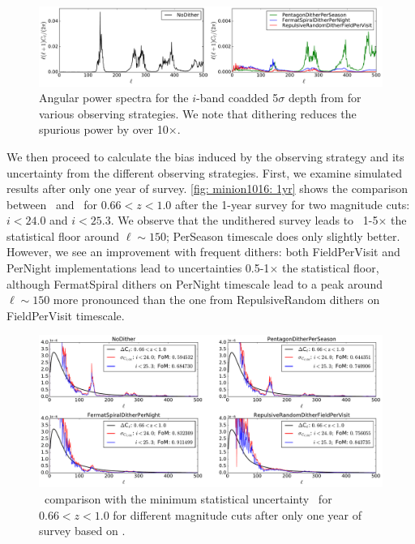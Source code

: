 \begin{figure}[!htb]
      \centering\includegraphics[width=\linewidth]{figs/awan_coaddpowerspectrum.pdf}
      \vspace*{-2em}
\caption{Angular power spectra for the  $i$-band coadded 5$\sigma$ depth from  for various observing strategies. We note that dithering reduces the spurious power by over 10$\times$.}
\label{fig: coaddPowerSpectrum}
\end{figure}

We then proceed to calculate the bias induced by the observing strategy and its uncertainty from the different observing strategies. First, we examine simulated results after only one year of survey. \autoref{fig: minion1016: 1yr} shows the comparison between \sigmaOS\ and \statFloor\ for $0.66<z<1.0$ after the 1-year survey for two magnitude cuts: $i<24.0$ and $i<25.3$. We observe that the undithered survey leads to \sigmaOS\ 1-5$\times$ the statistical floor around $\ell\sim150$; PerSeason timescale does only slightly better. However, we see an improvement with frequent dithers: both FieldPerVisit and PerNight implementations lead to uncertainties 0.5-1$\times$ the statistical floor, although FermatSpiral dithers on PerNight timescale lead to a peak around $\ell\sim150$ more pronounced than the one from RepulsiveRandom dithers on FieldPerVisit timescale.

\begin{figure}[!htb]
      \centering\hspace*{1em}\includegraphics[width=\linewidth]{figs/awan_1yr_minion1016_2magCuts.pdf}
       \vspace*{-2em}
\caption{\sigmaOS\ comparison with the minimum statistical uncertainty \statFloor\ for $0.66<z<1.0$ for different magnitude cuts after only one year of survey based on .}
\label{fig: minion1016: 1yr}
\end{figure}

